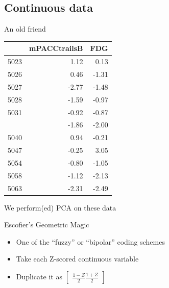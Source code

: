 \documentclass[
  ignorenonframetext,
]{beamer}
\providecommand{\tightlist}{%
  \setlength{\itemsep}{0pt}\setlength{\parskip}{0pt}}
\begin{document}
\hypertarget{continuous-data}{%
\subsection{Continuous data}\label{continuous-data}}

\begin{frame}{An old friend}
\protect\hypertarget{an-old-friend}{}

\begin{table}[H]
\centering\begingroup\fontsize{7}{9}\selectfont

\begin{tabular}{lrr}
\toprule
  & mPACCtrailsB & FDG\\
\midrule
5023 & 1.12 & 0.13\\
5026 & 0.46 & -1.31\\
5027 & -2.77 & -1.48\\
5028 & -1.59 & -0.97\\
5031 & -0.92 & -0.87\\
\addlinespace
5037 & -1.86 & -2.00\\
5040 & 0.94 & -0.21\\
5047 & -0.25 & 3.05\\
5054 & -0.80 & -1.05\\
5058 & -1.12 & -2.13\\
5063 & -2.31 & -2.49\\
\bottomrule
\end{tabular}\endgroup{}
\end{table}
\begin{center}We perform(ed) PCA on these data\end{center}

\end{frame}

\begin{frame}{Escofier's Geometric Magic}
\protect\hypertarget{escofiers-geometric-magic}{}

\begin{itemize}[<+->]
\tightlist
\item
  One of the ``fuzzy'' or ``bipolar'' coding schemes
\item
  Take each Z-scored continuous variable
\item
  Duplicate it as
  \(\begin{bmatrix} \frac{1-Z}{2} \frac{1+Z}{2}\end{bmatrix}\)
\end{itemize}

\end{frame}
\end{document}
